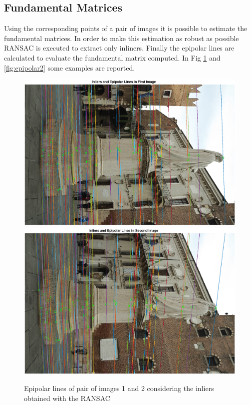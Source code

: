 \documentclass[12pt]{article}
\begin{document}
\subsection{Fundamental Matrices}
Using the corresponding points of a pair of images it is possible to estimate the fundamental matrices. In order to make this estimation as robust as possible RANSAC is executed to extract only inliners. Finally the epipolar lines are calculated to evaluate the fundamental matrix computed. In Fig \ref{fig:epipolar} and \ref{fig:epipolar2} some examples are reported.
\begin{figure}[H]
    \centering
    \includegraphics[scale=0.5]{images/epipolar.eps}
    \qquad
    \includegraphics[scale=0.5]{images/epipolar2.eps}
    \caption{Epipolar lines of pair of images 1 and 2 considering the inliers obtained with the RANSAC}
    \label{fig:epipolar}
\end{figure}
\end{document}
